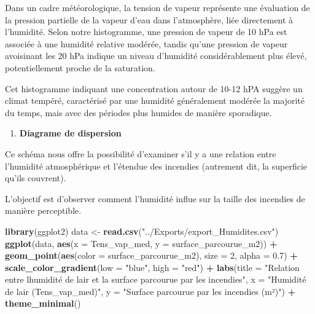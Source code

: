 \documentclass[
]{article}
\newenvironment{Shaded}{\begin{snugshade}}{\end{snugshade}}
\newcommand{\AttributeTok}[1]{\textcolor[rgb]{0.13,0.29,0.53}{#1}}
\newcommand{\DecValTok}[1]{\textcolor[rgb]{0.00,0.00,0.81}{#1}}
\newcommand{\FloatTok}[1]{\textcolor[rgb]{0.00,0.00,0.81}{#1}}
\newcommand{\FunctionTok}[1]{\textcolor[rgb]{0.13,0.29,0.53}{\textbf{#1}}}
\newcommand{\NormalTok}[1]{#1}
\newcommand{\OtherTok}[1]{\textcolor[rgb]{0.56,0.35,0.01}{#1}}
\newcommand{\SpecialCharTok}[1]{\textcolor[rgb]{0.81,0.36,0.00}{\textbf{#1}}}
\newcommand{\StringTok}[1]{\textcolor[rgb]{0.31,0.60,0.02}{#1}}
\providecommand{\tightlist}{%
  \setlength{\itemsep}{0pt}\setlength{\parskip}{0pt}}
\begin{document}
Dans un cadre météorologique, la tension de vapeur représente une
évaluation de la pression partielle de la vapeur d'eau dans
l'atmosphère, liée directement à l'humidité. Selon notre histogramme,
une pression de vapeur de 10 hPa est associée à une humidité relative
modérée, tandis qu'une pression de vapeur avoisinant les 20 hPa indique
un niveau d'humidité considérablement plus élevé, potentiellement proche
de la saturation.

Cet histogramme indiquant une concentration autour de 10-12 hPA suggère
un climat tempéré, caractérisé par une humidité généralement modérée la
majorité du temps, mais avec des périodes plus humides de manière
sporadique.

\begin{enumerate}
\def\labelenumi{\arabic{enumi}.}
\setcounter{enumi}{1}
\tightlist
\item
  \textbf{Diagrame de dispersion}
\end{enumerate}

Ce schéma nous offre la possibilité d'examiner s'il y a une relation
entre l'humidité atmosphérique et l'étendue des incendies (autrement
dit, la superficie qu'ils couvrent).

L'objectif est d'observer comment l'humidité influe sur la taille des
incendies de manière perceptible.

\begin{Shaded}
\begin{Highlighting}[]
\FunctionTok{library}\NormalTok{(ggplot2)}
\NormalTok{data }\OtherTok{\textless{}{-}} \FunctionTok{read.csv}\NormalTok{(}\StringTok{"../Exports/export\_Humidites.csv"}\NormalTok{)}
\FunctionTok{ggplot}\NormalTok{(data, }\FunctionTok{aes}\NormalTok{(}\AttributeTok{x =}\NormalTok{ Tens\_vap\_med, }\AttributeTok{y =}\NormalTok{ surface\_parcourue\_m2)) }\SpecialCharTok{+}
  \FunctionTok{geom\_point}\NormalTok{(}\FunctionTok{aes}\NormalTok{(}\AttributeTok{color =}\NormalTok{ surface\_parcourue\_m2), }\AttributeTok{size =} \DecValTok{2}\NormalTok{, }\AttributeTok{alpha =} \FloatTok{0.7}\NormalTok{) }\SpecialCharTok{+} 
  \FunctionTok{scale\_color\_gradient}\NormalTok{(}\AttributeTok{low =} \StringTok{"blue"}\NormalTok{, }\AttributeTok{high =} \StringTok{"red"}\NormalTok{) }\SpecialCharTok{+} 
  \FunctionTok{labs}\NormalTok{(}\AttributeTok{title =} \StringTok{"Relation entre l\textquotesingle{}humidité de l\textquotesingle{}air et la surface parcourue par les incendies"}\NormalTok{, }
       \AttributeTok{x =} \StringTok{"Humidité de l\textquotesingle{}air (Tens\_vap\_med)"}\NormalTok{, }
       \AttributeTok{y =} \StringTok{"Surface parcourue par les incendies (m²)"}\NormalTok{) }\SpecialCharTok{+}
  \FunctionTok{theme\_minimal}\NormalTok{()}
\end{Highlighting}
\end{Shaded}
\end{document}
